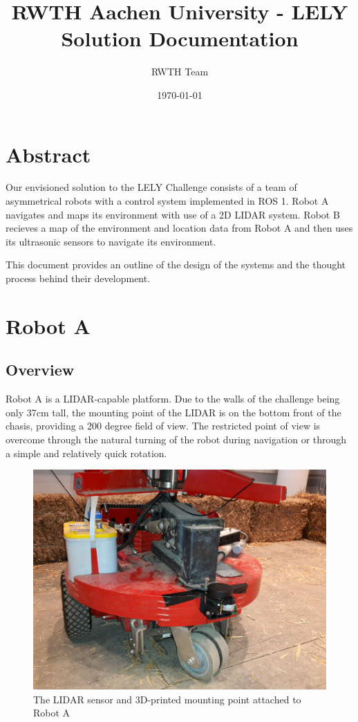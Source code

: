 \documentclass[11pt]{article}
\title{RWTH Aachen University - LELY Solution Documentation}
\author{RWTH Team}
\date{\today}
\begin{document}
	\maketitle	
	
	\section{Abstract}
	
	Our envisioned solution to the LELY Challenge consists of a team of asymmetrical robots with a control system implemented in ROS 1. Robot A navigates and maps its environment with use of a 2D LIDAR system. Robot B recieves a map of the environment and location data from Robot A and then uses its ultrasonic sensors to navigate its environment.\newline
	
	This document provides an outline of the design of the systems and the thought process behind their development.
	
	\section{Robot A}
	
	\subsection{Overview}
	Robot A is a LIDAR-capable platform. Due to the walls of the challenge being only 37cm tall, the mounting point of the LIDAR is on the bottom front of the chasis, providing a 200 degree field of view. The restricted point of view is overcome through the natural turning of the robot during navigation or through a simple and relatively quick rotation.
	
	\begin{figure}[h!]
		\centering
		\includegraphics[scale=0.1]{robot_a}
		\caption{The LIDAR sensor and 3D-printed mounting point attached to Robot A}
	\end{figure}
	
\end{document}
